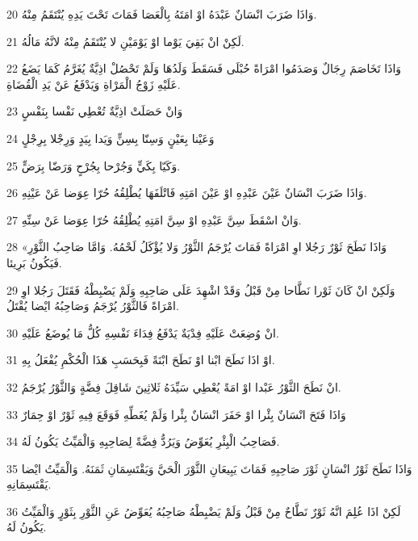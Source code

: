 \par 20 وَاذَا ضَرَبَ انْسَانٌ عَبْدَهُ اوْ امَتَهُ بِالْعَصَا فَمَاتَ تَحْتَ يَدِهِ يُنْتَقَمُ مِنْهُ.
\par 21 لَكِنْ انْ بَقِيَ يَوْما اوْ يَوْمَيْنِ لا يُنْتَقَمُ مِنْهُ لانَّهُ مَالُهُ.
\par 22 وَاذَا تَخَاصَمَ رِجَالٌ وَصَدَمُوا امْرَاةً حُبْلَى فَسَقَطَ وَلَدُهَا وَلَمْ تَحْصُلْ اذِيَّةٌ يُغَرَّمُ كَمَا يَضَعُ عَلَيْهِ زَوْجُ الْمَرْاةِ وَيَدْفَعُ عَنْ يَدِ الْقُضَاةِ.
\par 23 وَانْ حَصَلَتْ اذِيَّةٌ تُعْطِي نَفْسا بِنَفْسٍ
\par 24 وَعَيْنا بِعَيْنٍ وَسِنّا بِسِنٍّ وَيَدا بِيَدٍ وَرِجْلا بِرِجْلٍ
\par 25 وَكَيّا بِكَيٍّ وَجُرْحا بِجُرْحٍ وَرَضّا بِرَضٍّ.
\par 26 وَاذَا ضَرَبَ انْسَانٌ عَيْنَ عَبْدِهِ اوْ عَيْنَ امَتِهِ فَاتْلَفَهَا يُطْلِقُهُ حُرّا عِوَضا عَنْ عَيْنِهِ.
\par 27 وَانْ اسْقَطَ سِنَّ عَبْدِهِ اوْ سِنَّ امَتِهِ يُطْلِقُهُ حُرّا عِوَضا عَنْ سِنِّهِ.
\par 28 «وَاذَا نَطَحَ ثَوْرٌ رَجُلا اوِ امْرَاةً فَمَاتَ يُرْجَمُ الثَّوْرُ وَلا يُؤْكَلُ لَحْمُهُ. وَامَّا صَاحِبُ الثَّوْرِ فَيَكُونُ بَرِيئا.
\par 29 وَلَكِنْ انْ كَانَ ثَوْرا نَطَّاحا مِنْ قَبْلُ وَقَدْ اشْهِدَ عَلَى صَاحِبِهِ وَلَمْ يَضْبِطْهُ فَقَتَلَ رَجُلا اوِ امْرَاةً فَالثَّوْرُ يُرْجَمُ وَصَاحِبُهُ ايْضا يُقْتَلُ.
\par 30 انْ وُضِعَتْ عَلَيْهِ فِدْيَةٌ يَدْفَعُ فِدَاءَ نَفْسِهِ كُلُّ مَا يُوضَعُ عَلَيْهِ.
\par 31 اوْ اذَا نَطَحَ ابْنا اوْ نَطَحَ ابْنَةً فَبِحَسَبِ هَذَا الْحُكْمِ يُفْعَلُ بِهِ.
\par 32 انْ نَطَحَ الثَّوْرُ عَبْدا اوْ امَةً يُعْطِي سَيِّدَهُ ثَلاثِينَ شَاقِلَ فِضَّةٍ وَالثَّوْرُ يُرْجَمُ.
\par 33 وَاذَا فَتَحَ انْسَانٌ بِئْرا اوْ حَفَرَ انْسَانٌ بِئْرا وَلَمْ يُغَطِّهِ فَوَقَعَ فِيهِ ثَوْرٌ اوْ حِمَارٌ
\par 34 فَصَاحِبُ الْبِئْرِ يُعَوِّضُ وَيَرُدُّ فِضَّةً لِصَاحِبِهِ وَالْمَيِّتُ يَكُونُ لَهُ.
\par 35 وَاذَا نَطَحَ ثَوْرُ انْسَانٍ ثَوْرَ صَاحِبِهِ فَمَاتَ يَبِيعَانِ الثَّوْرَ الْحَيَّ وَيَقْتَسِمَانِ ثَمَنَهُ. وَالْمَيِّتُ ايْضا يَقْتَسِمَانِهِ.
\par 36 لَكِنْ اذَا عُلِمَ انَّهُ ثَوْرٌ نَطَّاحٌ مِنْ قَبْلُ وَلَمْ يَضْبِطْهُ صَاحِبُهُ يُعَوِّضُ عَنِ الثَّوْرِ بِثَوْرٍ وَالْمَيِّتُ يَكُونُ لَهُ.

